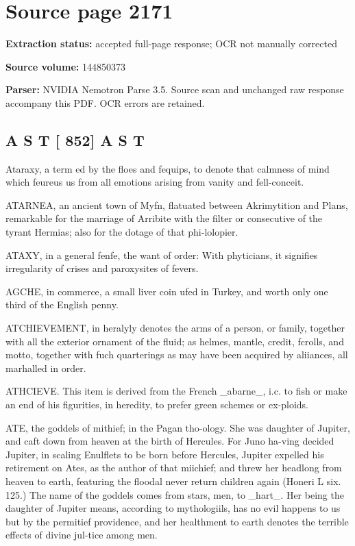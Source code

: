 \clearpage
\section{Source page 2171}
\textbf{Extraction status:} accepted full-page response; OCR not manually corrected\par
\textbf{Source volume:} 144850373\par
\textbf{Parser:} NVIDIA Nemotron Parse 3.5. Source scan and unchanged raw response accompany this PDF. OCR errors are retained.\par\medskip
\subsection*{A S T [ 852] A S T}
Ataraxy, a term ed by the floes and fequips, to denote that calmness of mind which feureus us from all emotions arising from vanity and fell-conceit.\par\medskip
ATARNEA, an ancient town of Myfn, flatuated between Akrimytition and Plans, remarkable for the marriage of Arribite with the filter or consecutive of the tyrant Hermias; also for the dotage of that phi-lolopier.\par\medskip
ATAXY, in a general fenfe, the want of order: With phyticians, it signifies irregularity of crises and paroxysites of fevers.\par\medskip
AGCHE, in commerce, a small liver coin ufed in Turkey, and worth only one third of the English penny.\par\medskip
ATCHIEVEMENT, in heralyly denotes the arms of a person, or family, together with all the exterior ornament of the fluid; as helmes, mantle, credit, fcrolls, and motto, together with fuch quarterings as may have been acquired by aliiances, all marhalled in order.\par\medskip
ATHCIEVE. This item is derived from the French \_abarne\_, i.c. to fish or make an end of his figurities, in heredity, to prefer green schemes or ex-ploids.\par\medskip
ATE, the goddels of mithief; in the Pagan tho-ology. She was daughter of Jupiter, and caft down from heaven at the birth of Hercules. For Juno ha-ving decided Jupiter, in scaling Enulflets to be born before Hercules, Jupiter expelled his retirement on Ates, as the author of that miichief; and threw her headlong from heaven to earth, featuring the floodal never return children again (Honeri L six. 125.) The name of the goddels comes from stars, men, to \_hart\_. Her being the daughter of Jupiter means, according to mythologiils, has no evil happens to us but by the permitief providence, and her healthment to earth denotes the terrible effects of divine jul-tice among men.\par\medskip
